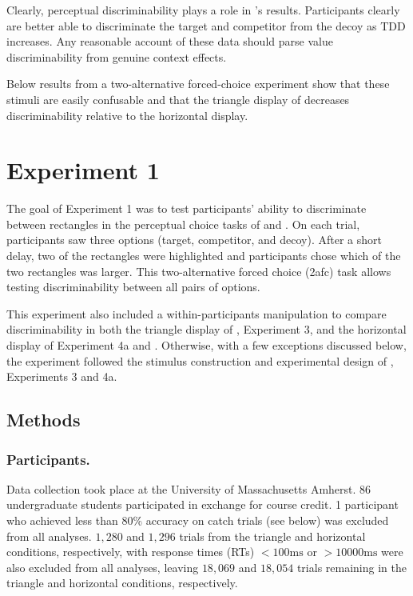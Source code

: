 Clearly, perceptual discriminability plays a role in \textcite{spektorWhenGoodLooks2018b}'s results. Participants clearly are better able to discriminate the target and competitor from the decoy as TDD increases. Any reasonable account of these data should parse value discriminability from genuine context effects.

Below results from a two-alternative forced-choice experiment show that these stimuli are easily confusable and that the triangle display of \textcite{spektorWhenGoodLooks2018b} decreases discriminability relative to the horizontal display. 

\section{Experiment 1}

The goal of Experiment 1 was to test participants' ability to discriminate between rectangles in the perceptual choice tasks of \textcite{trueblood2013not} and \textcite{spektorWhenGoodLooks2018b}. 
On each trial, participants saw three options (target, competitor, and decoy). After a short delay, two of the rectangles were highlighted and participants chose which of the two rectangles was larger. This two-alternative forced choice (2afc) task allows testing discriminability between all pairs of options. 

This experiment also included a within-participants manipulation to compare discriminability in both the triangle display of \textcite{spektorWhenGoodLooks2018b}, Experiment 3, and the horizontal display of \textcite{spektorWhenGoodLooks2018b} Experiment 4a and \textcite{trueblood2013not}. Otherwise, with a few exceptions discussed below, the experiment followed the stimulus construction and experimental design of \textcite{spektorWhenGoodLooks2018b}, Experiments 3 and 4a. 

\subsection{Methods}

\subsubsection{Participants.}
Data collection took place at the University of Massachusetts Amherst. 86 undergraduate students participated in exchange for course credit. 1 participant who achieved less than $80\%$ accuracy on catch trials (see below) was excluded from all analyses. $1,280$ and $1,296$ trials from the triangle and horizontal conditions, respectively, with response times (RTs) $<100\text{ms}$ or  $>10000\text{ms}$ were also excluded from all analyses, leaving $18,069$ and $18,054$ trials remaining in the triangle and horizontal conditions, respectively. 

